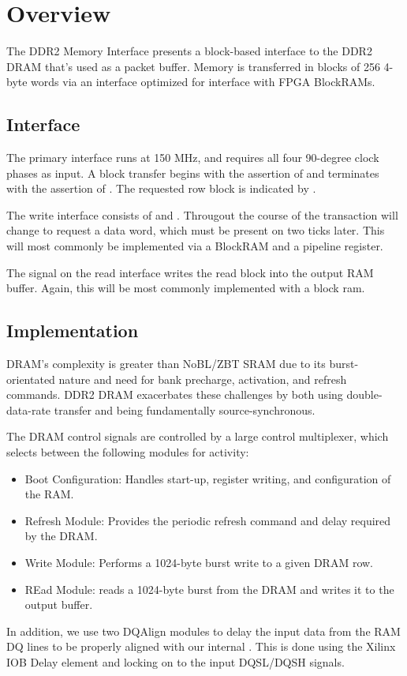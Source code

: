 \section{Overview}

The DDR2 Memory Interface presents a block-based interface to the DDR2
DRAM that's used as a packet buffer. Memory is transferred in blocks
of 256 4-byte words via an interface optimized for interface with FPGA
BlockRAMs.


\subsection{Interface}
The primary interface runs at 150 MHz, and requires all four 90-degree
clock phases as input. A block transfer begins with the assertion of
 and terminates with the assertion of . The
requested row block is indicated by .

The write interface consists of  and
. Througout the course of the transaction
 will change to request a data word, which must be
present on  two ticks later. This will most
commonly be implemented via a BlockRAM and a pipeline register.

The  signal on the read interface writes the read block
into the output RAM buffer. Again, this will be most commonly
implemented with a block ram.

\subsection{Implementation} 
DRAM's complexity is greater than NoBL/ZBT SRAM due to its
burst-orientated nature and need for bank precharge, activation, and
refresh commands. DDR2 DRAM exacerbates these challenges by both using
double-data-rate transfer and being fundamentally source-synchronous.

The DRAM control signals are controlled by a large control
multiplexer, which selects between the following modules for activity:

\begin{itemize}
\item Boot Configuration: Handles start-up, register writing, and configuration of the RAM. 
\item Refresh Module: Provides the periodic refresh command and delay required by the DRAM. 
\item Write Module: Performs a 1024-byte burst write to a given DRAM row. 
\item REad Module: reads a 1024-byte burst from the DRAM and writes it to the output buffer. 
\end{itemize}

In addition, we use two DQAlign modules to delay the input data from
the RAM DQ lines to be properly aligned with our internal
. This is done using the Xilinx IOB Delay element and
locking on to the input DQSL/DQSH signals.

